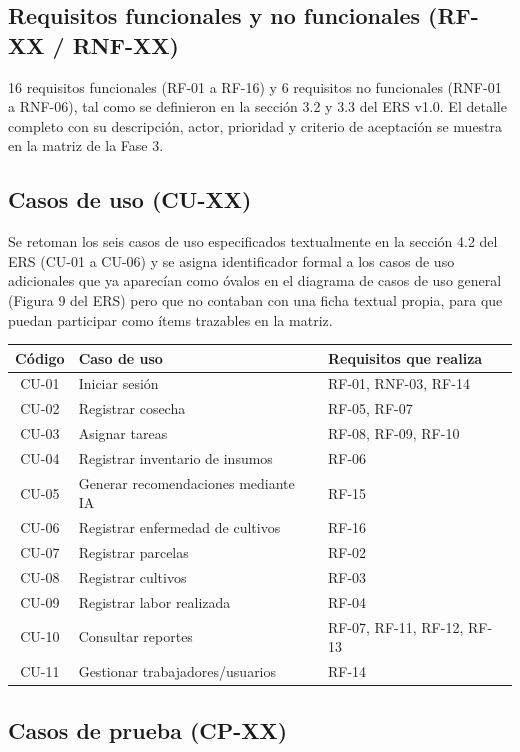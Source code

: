 \documentclass[12pt,a4paper]{article}
\begin{document}
\subsection{Requisitos funcionales y no funcionales (RF-XX / RNF-XX)}

16 requisitos funcionales (RF-01 a RF-16) y 6 requisitos no funcionales (RNF-01 a RNF-06), tal como se definieron en la sección 3.2 y 3.3 del ERS v1.0. El detalle completo con su descripción, actor, prioridad y criterio de aceptación se muestra en la matriz de la Fase 3.

\subsection{Casos de uso (CU-XX)}

Se retoman los seis casos de uso especificados textualmente en la sección 4.2 del ERS (CU-01 a CU-06) y se asigna identificador formal a los casos de uso adicionales que ya aparecían como óvalos en el diagrama de casos de uso general (Figura 9 del ERS) pero que no contaban con una ficha textual propia, para que puedan participar como ítems trazables en la matriz.

\begin{longtable}{@{}cll@{}}
\toprule
\textbf{Código} & \textbf{Caso de uso} & \textbf{Requisitos que realiza} \\
\midrule
\endhead
CU-01 & Iniciar sesión & RF-01, RNF-03, RF-14 \\
CU-02 & Registrar cosecha & RF-05, RF-07 \\
CU-03 & Asignar tareas & RF-08, RF-09, RF-10 \\
CU-04 & Registrar inventario de insumos & RF-06 \\
CU-05 & Generar recomendaciones mediante IA & RF-15 \\
CU-06 & Registrar enfermedad de cultivos & RF-16 \\
CU-07 & Registrar parcelas & RF-02 \\
CU-08 & Registrar cultivos & RF-03 \\
CU-09 & Registrar labor realizada & RF-04 \\
CU-10 & Consultar reportes & RF-07, RF-11, RF-12, RF-13 \\
CU-11 & Gestionar trabajadores/usuarios & RF-14 \\
\bottomrule
\end{longtable}

\subsection{Casos de prueba (CP-XX)}
\end{document}

